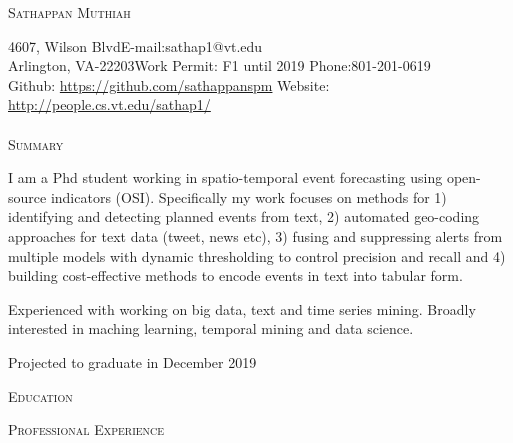 \documentclass[a4paper]{article}
\newcommand{\lineunder} {\vspace*{-8pt} \\
    \hspace*{-18pt} \hrulefill \\
}
\newcommand{\header} [1] {{\hspace*{-18pt}\vspace*{6pt}\large {\textsc{#1}}}
    \vspace*{-6pt} %
}
\begin{document}

\vspace*{-35pt}

\begin{center}
	{\huge \scshape {Sathappan Muthiah}}\\
\end{center}
\small
4607, Wilson Blvd\hfill E-mail:sathap1@vt.edu\\
Arlington, VA-22203\hfill Work Permit: F1 until 2019 \hfill
Phone:801-201-0619 \\
Github: \url{https://github.com/sathappanspm} \hfill Website:
\url{http://people.cs.vt.edu/sathap1/}  \normalsize \lineunder

%
\header{Summary}

I am a Phd student working in spatio-temporal event forecasting using
open-source indicators (OSI). Specifically my work focuses on methods
for 1) identifying and
detecting planned events from text, 2) automated geo-coding approaches
for text data (tweet, news etc), 3) fusing and suppressing alerts from
multiple models with dynamic thresholding to control precision and
recall and 4) building cost-effective methods to encode events in text
into tabular form.  %

Experienced with working on big data, text and time series mining.
Broadly interested in maching learning, temporal mining and data
science.

Projected to graduate in December 2019

\vspace{1em}
\header{Education}


%

\vspace{1em}
\header{Professional Experience}

\end{document}
